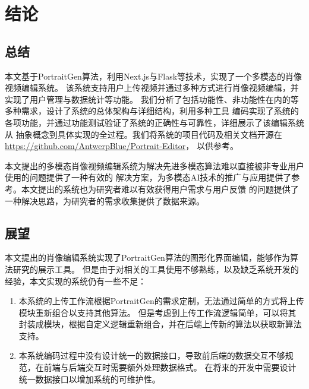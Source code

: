 \chapter{结论}

\section{总结}

本文基于PortraitGen算法，利用Next.js与Flask等技术，实现了一个多模态的肖像视频编辑系统。
该系统支持用户上传视频并通过多种方式进行肖像视频编辑，并实现了用户管理与数据统计等功能。
我们分析了包括功能性、非功能性在内的等多种需求，设计了系统的总体架构与详细结构，利用多种工具
编码实现了系统的各项功能，并通过功能测试验证了系统的正确性与可靠性，详细展示了该编辑系统从
抽象概念到具体实现的全过程。我们将系统的项目代码及相关文档开源在\url{https://github.com/AntwerpBlue/Portrait-Editor}，
以供参考。

本文提出的多模态肖像视频编辑系统为解决先进多模态算法难以直接被非专业用户使用的问题提供了一种有效的
解决方案，为多模态AI技术的推广与应用提供了参考。本文提出的系统也为研究者难以有效获得用户需求与用户反馈
的问题提供了一种解决思路，为研究者的需求收集提供了数据来源。

\section{展望}

本文提出的肖像编辑系统实现了PortraitGen算法的图形化界面编辑，能够作为算法研究的展示工具。
但是由于对相关的工具使用不够熟练，以及缺乏系统开发的经验，本文实现的系统仍有一些不足：
\begin{enumerate}
    \item 本系统的上传工作流根据PortraitGen的需求定制，无法通过简单的方式将上传模块重新组合以支持其他算法。
    但是考虑到上传工作流逻辑简单，可以将其封装成模块，根据自定义逻辑重新组合，并在后端上传新的算法以获取新算法支持。
    \item 本系统编码过程中没有设计统一的数据接口，导致前后端的数据交互不够规范，在前端与后端交互时需要额外处理数据格式。
    在将来的开发中需要设计统一数据接口以增加系统的可维护性。
\end{enumerate}